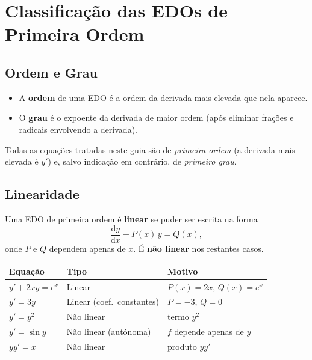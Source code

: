 \documentclass[12pt, a4paper]{article}
\newcommand{\dd}{\mathrm{d}}
\begin{document}
\section{Classificação das EDOs de Primeira Ordem}
\label{sec:classification}

\subsection{Ordem e Grau}

\begin{defbox}
  \begin{itemize}
    \item A \textbf{ordem} de uma EDO é a ordem da derivada mais elevada que nela aparece.
    \item O \textbf{grau} é o expoente da derivada de maior ordem (após eliminar frações e
          radicais envolvendo a derivada).
  \end{itemize}
\end{defbox}

Todas as equações tratadas neste guia são de \emph{primeira ordem} (a derivada mais elevada
é $y'$) e, salvo indicação em contrário, de \emph{primeiro grau}.

\subsection{Linearidade}

\begin{defbox}
  Uma EDO de primeira ordem é \textbf{linear} se puder ser escrita na forma
  \[
    \frac{\dd y}{\dd x} + P(x)\,y = Q(x),
  \]
  onde $P$ e $Q$ dependem apenas de $x$. É \textbf{não linear} nos restantes casos.
\end{defbox}

\begin{center}
\begin{tabular}{lll}
  \toprule
  \textbf{Equação} & \textbf{Tipo} & \textbf{Motivo} \\
  \midrule
  $y' + 2xy = e^x$  & Linear                      & $P(x)=2x$, $Q(x)=e^x$ \\
  $y' = 3y$          & Linear (coef.\ constantes)  & $P=-3$, $Q=0$ \\
  $y' = y^2$         & Não linear                  & termo $y^2$ \\
  $y' = \sin y$      & Não linear (autónoma)       & $f$ depende apenas de $y$ \\
  $yy' = x$          & Não linear                  & produto $yy'$ \\
  \bottomrule
\end{tabular}
\end{center}
\end{document}
